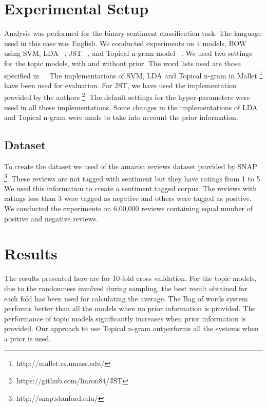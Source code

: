 \documentclass[11pt]{article}
\begin{document}
\section{Experimental Setup}\label{experiments}

Analysis was performed for the binary sentiment classification task. The language used in this case was English.
We conducted experiments on 4 models, BOW using SVM, LDA ~\cite{blei2003latent}, JST ~\cite{lin2009joint}, and 
Topical n-gram model ~\cite{wang2007topical}. We used two settings for the topic models, with and without prior. 
The word lists used are those specified in ~\cite{liu2010sentiment}. The implementations of SVM, LDA and Topical
n-gram in Mallet \footnote{http://mallet.cs.umass.edu/} have been used for evaluation. For JST, we have used the 
implementation provided by the authors \footnote{https://github.com/linron84/JST}. The default settings for the
hyper-parameters were used in all these implementations. Some changes in the implementations of LDA and Topical
n-gram were made to take into account the prior information.

\subsection*{Dataset}

To create the dataset we used of the amazon reviews dataset provided by SNAP \footnote{http://snap.stanford.edu/}.
These reviews are not tagged with sentiment but they have ratings from 1 to 5. We used this information to create
a sentiment tagged corpus. The reviews with ratings less than 3 were tagged as negative and others were tagged
as positive. We conducted the experiments on 6,00,000 reviews containing equal number of positive and negative
reviews.

\section{Results}\label{results}

The results presented here are for 10-fold cross validation. For the topic models, due to the randomness involved 
during sampling, the best result obtained for each fold has been used for calculating the average. The Bag of words 
system performs better than all the models when no prior information is provided. The performance of topic models 
significantly increases when prior information is provided. Our approach to use Topical n-gram outperforms all the 
systems when a prior is used.
\end{document}
